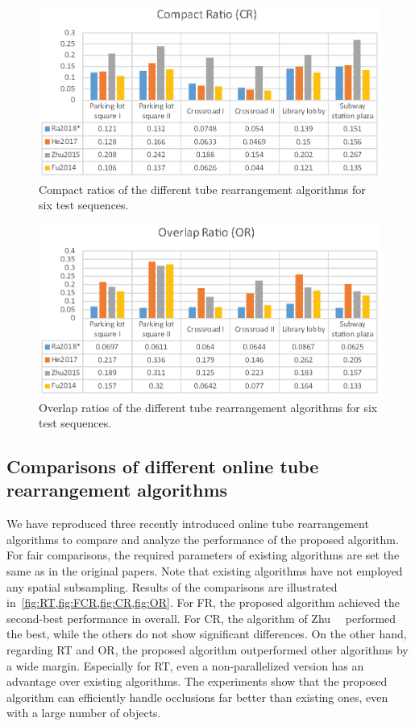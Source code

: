 \documentclass[11pt]{hyu_thesis}
\begin{document}
\begin{figure}[t]
\begin{center}
\includegraphics[width=0.9\linewidth]{CR.eps}
\end{center}
   \caption{Compact ratios of the different tube rearrangement algorithms for six test sequences.}
\label{fig:CR}
\end{figure}

\begin{figure}[t]
\begin{center}
\includegraphics[width=0.9\linewidth]{OR.eps}
\end{center}
   \caption{Overlap ratios of the different tube rearrangement algorithms for six test sequences.}
\label{fig:OR}
\end{figure}

\subsection{Comparisons of different online tube rearrangement algorithms}
We have reproduced three recently introduced online tube rearrangement algorithms to compare and analyze the performance of the proposed algorithm. For fair comparisons, the required parameters of existing algorithms are set the same as in the original papers. Note that existing algorithms have not employed any spatial subsampling. Results of the comparisons are illustrated in~\cref{fig:RT,fig:FCR,fig:CR,fig:OR}. For FR, the proposed algorithm achieved the second-best performance in overall. For CR, the algorithm of Zhu~\etal~\cite{JianqingZhu2015} performed the best, while the others do not show significant differences. On the other hand, regarding RT and OR, the proposed algorithm outperformed other algorithms by a wide margin. Especially for RT, even a non-parallelized version has an advantage over existing algorithms. The experiments show that the proposed algorithm can efficiently handle occlusions far better than existing ones, even with a large number of objects.
\end{document}

